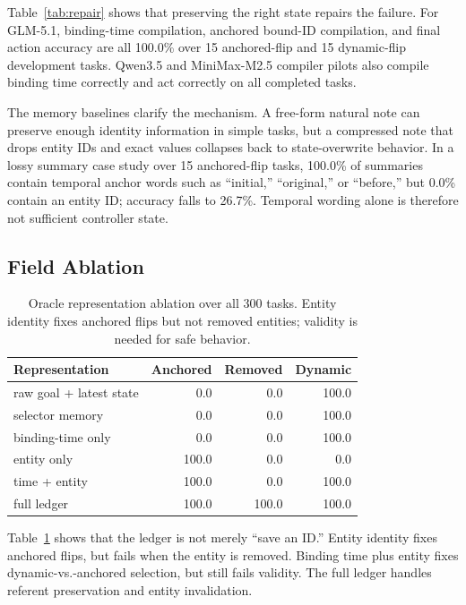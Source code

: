 \documentclass[letterpaper]{article}
\begin{document}
Table~\ref{tab:repair} shows that preserving the right state repairs the failure. For GLM-5.1, binding-time compilation, anchored bound-ID compilation, and final action accuracy are all 100.0\% over 15 anchored-flip and 15 dynamic-flip development tasks. Qwen3.5 and MiniMax-M2.5 compiler pilots also compile binding time correctly and act correctly on all completed tasks.

The memory baselines clarify the mechanism. A free-form natural note can preserve enough identity information in simple tasks, but a compressed note that drops entity IDs and exact values collapses back to state-overwrite behavior. In a lossy summary case study over 15 anchored-flip tasks, 100.0\% of summaries contain temporal anchor words such as ``initial,'' ``original,'' or ``before,'' but 0.0\% contain an entity ID; accuracy falls to 26.7\%. Temporal wording alone is therefore not sufficient controller state.

\subsection{Field Ablation}

\begin{table}[t]
\centering
\small
\begin{tabular}{lrrr}
\toprule
Representation & Anchored & Removed & Dynamic \\
\midrule
raw goal + latest state & 0.0 & 0.0 & 100.0 \\
selector memory & 0.0 & 0.0 & 100.0 \\
binding-time only & 0.0 & 0.0 & 100.0 \\
entity only & 100.0 & 0.0 & 0.0 \\
time + entity & 100.0 & 0.0 & 100.0 \\
full ledger & 100.0 & 100.0 & 100.0 \\
\bottomrule
\end{tabular}
\caption{Oracle representation ablation over all 300 tasks. Entity identity fixes anchored flips but not removed entities; validity is needed for safe behavior.}
\label{tab:ablation}
\end{table}

Table~\ref{tab:ablation} shows that the ledger is not merely ``save an ID.'' Entity identity fixes anchored flips, but fails when the entity is removed. Binding time plus entity fixes dynamic-vs.-anchored selection, but still fails validity. The full ledger handles referent preservation and entity invalidation.
\end{document}

